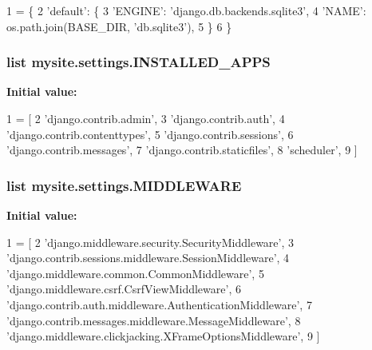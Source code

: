 \begin{DoxyCode}
1 = \{
2     \textcolor{stringliteral}{'default'}: \{
3         \textcolor{stringliteral}{'ENGINE'}: \textcolor{stringliteral}{'django.db.backends.sqlite3'},
4         \textcolor{stringliteral}{'NAME'}: os.path.join(BASE\_DIR, \textcolor{stringliteral}{'db.sqlite3'}),
5     \}
6 \}
\end{DoxyCode}
\hypertarget{namespacemysite_1_1settings_ae0300504ffe212a8082806286d6fe36b}{
\subsubsection[{I\-N\-S\-T\-A\-L\-L\-E\-D\-\_\-\-A\-P\-P\-S}]{\setlength{\rightskip}{0pt plus 5cm}list mysite.\-settings.\-I\-N\-S\-T\-A\-L\-L\-E\-D\-\_\-\-A\-P\-P\-S}}\label{namespacemysite_1_1settings_ae0300504ffe212a8082806286d6fe36b}
{\bfseries Initial value\-:}
\begin{DoxyCode}
1 = [
2     \textcolor{stringliteral}{'django.contrib.admin'},
3     \textcolor{stringliteral}{'django.contrib.auth'},
4     \textcolor{stringliteral}{'django.contrib.contenttypes'},
5     \textcolor{stringliteral}{'django.contrib.sessions'},
6     \textcolor{stringliteral}{'django.contrib.messages'},
7     \textcolor{stringliteral}{'django.contrib.staticfiles'},
8     \textcolor{stringliteral}{'scheduler'},
9 ]
\end{DoxyCode}
\hypertarget{namespacemysite_1_1settings_a90df4fc7c17f07da22241f9ceb21f3b9}{
\subsubsection[{M\-I\-D\-D\-L\-E\-W\-A\-R\-E}]{\setlength{\rightskip}{0pt plus 5cm}list mysite.\-settings.\-M\-I\-D\-D\-L\-E\-W\-A\-R\-E}}\label{namespacemysite_1_1settings_a90df4fc7c17f07da22241f9ceb21f3b9}
{\bfseries Initial value\-:}
\begin{DoxyCode}
1 = [
2     \textcolor{stringliteral}{'django.middleware.security.SecurityMiddleware'},
3     \textcolor{stringliteral}{'django.contrib.sessions.middleware.SessionMiddleware'},
4     \textcolor{stringliteral}{'django.middleware.common.CommonMiddleware'},
5     \textcolor{stringliteral}{'django.middleware.csrf.CsrfViewMiddleware'},
6     \textcolor{stringliteral}{'django.contrib.auth.middleware.AuthenticationMiddleware'},
7     \textcolor{stringliteral}{'django.contrib.messages.middleware.MessageMiddleware'},
8     \textcolor{stringliteral}{'django.middleware.clickjacking.XFrameOptionsMiddleware'},
9 ]
\end{DoxyCode}
